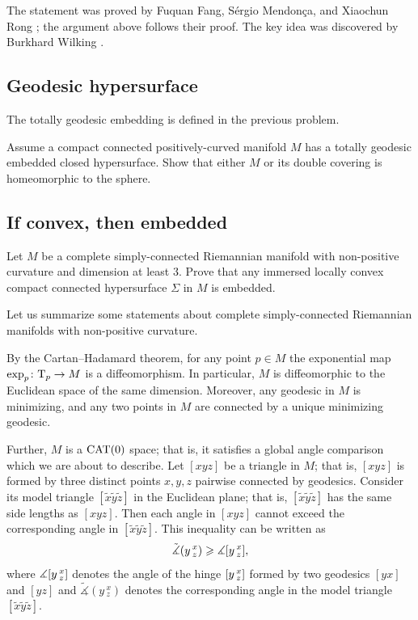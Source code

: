 The statement was proved by 
Fuquan Fang, 
Sérgio Mendonça,
and Xiaochun Rong \cite{FMR}; the argument above follows their proof.
The key idea was discovered by
Burkhard Wilking \cite{wilking-2003}.

\subsection*{Geodesic hypersurface}
\label{Geodesic hypersurface}

The totally geodesic embedding is defined in the previous problem.

\begin{pr}
Assume a compact connected positively-curved manifold $M$ has a totally geodesic embedded closed hypersurface.
Show that either $M$ or its double covering is homeomorphic to the sphere.
\end{pr}

\subsection*{If convex, then embedded}
\label{If convex then embedded} 

\begin{pr}
Let $M$ be a complete simply-connected Riemannian manifold 
with non-positive curvature 
and dimension at least $3$.
Prove that any immersed locally convex
compact connected hypersurface $\Sigma$ in $M$ is embedded.
\end{pr}

Let us summarize some statements about complete simply-connected Riemannian manifolds 
with non-positive curvature.

By the Cartan--Hadamard theorem, for any point $p\in M$
the exponential map $\exp_p\colon\mathrm{T}_p\to M$ is a diffeomorphism.
In particular, $M$ is diffeomorphic to the Euclidean space of the same dimension.
Moreover, any geodesic in $M$ is minimizing,
and any two points in $M$ are connected by a unique minimizing geodesic.

Further, $M$ is a $\operatorname{\rm CAT}\nolimits(0)$ space; that is, it satisfies a global angle comparison which we are about to describe.
Let $[xyz]$ be a triangle in $M$;
that is, $[xyz]$ is formed by three distinct points $x,y,z$ pairwise connected by geodesics.
Consider its model triangle $[\tilde x\tilde y\tilde z]$ in the Euclidean plane;
that is, $[\tilde x\tilde y\tilde z]$ has the same side lengths as $[xyz]$.
Then each angle in $[xyz]$ cannot exceed the corresponding angle in $[\tilde x\tilde y\tilde z]$.
This inequality can be written as
\[\tilde\measuredangle(y\,^x_z)\geqslant\measuredangle[y\,{}^{x}_{z}],\]
where $\measuredangle[y\,{}^{x}_{z}]$ denotes the angle of the hinge $[y\,{}^{x}_{z}]$ formed by two geodesics $[yx]$ and $[yz]$ 
and $\tilde\measuredangle(y\,^x_z)$ denotes the corresponding angle in the model triangle $[\tilde x\tilde y\tilde z]$.

